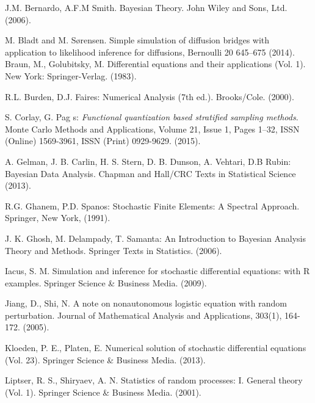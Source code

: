 \documentclass[12pt, reqno]{amsart}
\newcommand{\1}{{\bf 1}}
\newcommand{\2}{{\bf 2}}
\theoremstyle{definition}
\theoremstyle{remark}
\numberwithin{equation}{section}
\begin{document}
\begin{thebibliography}{999}

 J.M. Bernardo, A.F.M Smith. Bayesian Theory.  John Wiley and Sons, Ltd. (2006). 

 M. Bladt and M. S\o rensen. Simple simulation of diffusion bridges with application to likelihood inference for diffusions, Bernoulli 20 645–675 (2014).
 Braun, M.,  Golubitsky, M.  Differential equations and their applications (Vol. 1). New York: Springer-Verlag. (1983).


 R.L. Burden, D.J. Faires: Numerical Analysis (7th ed.). Brooks/Cole. (2000).

 S. Corlay, G. Pag s: {\it Functional quantization based stratified sampling methods}. Monte Carlo Methods and Applications, Volume 21, Issue 1, Pages 1–32, ISSN (Online) 1569-3961, ISSN (Print) 0929-9629. (2015).


 A. Gelman, J. B. Carlin, H. S. Stern, D. B. Dunson, A. Vehtari, D.B Rubin: Bayesian Data Analysis. Chapman and Hall/CRC Texts in Statistical Science (2013).

  R.G. Ghanem, P.D. Spanos: Stochastic Finite Elements: A Spectral Approach. Springer, New York, (1991).


 J. K. Ghosh, M. Delampady, T. Samanta: An Introduction to Bayesian Analysis Theory and Methods. Springer Texts in Statistics. (2006). 

 Iacus, S. M. Simulation and inference for stochastic differential equations: with R examples. Springer Science \& Business Media. (2009).

 Jiang, D., Shi, N. A note on nonautonomous logistic equation with random perturbation. Journal of Mathematical Analysis and Applications, 303(1), 164-172. (2005). 

 Kloeden, P. E.,  Platen, E.  Numerical solution of stochastic differential equations (Vol. 23). Springer Science \& Business Media. (2013).


 Liptser, R. S., Shiryaev, A. N.  Statistics of random processes: I. General theory (Vol. 1). Springer Science \& Business Media. (2001).


\end{thebibliography}
\end{document}

